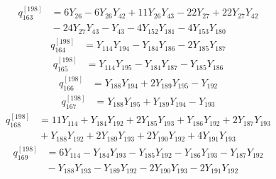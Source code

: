 \begin{equation}\label{q198:row:163}
\begin{aligned}
q_{163}^{[198]} &={} 6Y_{26} - 6Y_{26}Y_{42} + 11Y_{26}Y_{43} - 22Y_{27} + 22Y_{27}Y_{42}\\
&{} - 24Y_{27}Y_{43} - Y_{43} - 4Y_{152}Y_{181} - 4Y_{153}Y_{180}
\end{aligned}
\end{equation}
\begin{equation}\label{q198:row:164}
\begin{aligned}
q_{164}^{[198]} &={} Y_{114}Y_{194} - Y_{184}Y_{186} - 2Y_{185}Y_{187}
\end{aligned}
\end{equation}
\begin{equation}\label{q198:row:165}
\begin{aligned}
q_{165}^{[198]} &={} Y_{114}Y_{195} - Y_{184}Y_{187} - Y_{185}Y_{186}
\end{aligned}
\end{equation}
\begin{equation}\label{q198:row:166}
\begin{aligned}
q_{166}^{[198]} &={} Y_{188}Y_{194} + 2Y_{189}Y_{195} - Y_{192}
\end{aligned}
\end{equation}
\begin{equation}\label{q198:row:167}
\begin{aligned}
q_{167}^{[198]} &={} Y_{188}Y_{195} + Y_{189}Y_{194} - Y_{193}
\end{aligned}
\end{equation}
\begin{equation}\label{q198:row:168}
\begin{aligned}
q_{168}^{[198]} &={} 11Y_{114} + Y_{184}Y_{192} + 2Y_{185}Y_{193} + Y_{186}Y_{192} + 2Y_{187}Y_{193}\\
&{} + Y_{188}Y_{192} + 2Y_{189}Y_{193} + 2Y_{190}Y_{192} + 4Y_{191}Y_{193}
\end{aligned}
\end{equation}
\begin{equation}\label{q198:row:169}
\begin{aligned}
q_{169}^{[198]} &={} 6Y_{114} - Y_{184}Y_{193} - Y_{185}Y_{192} - Y_{186}Y_{193} - Y_{187}Y_{192}\\
&{} - Y_{188}Y_{193} - Y_{189}Y_{192} - 2Y_{190}Y_{193} - 2Y_{191}Y_{192}
\end{aligned}
\end{equation}
